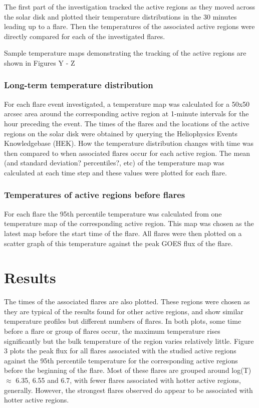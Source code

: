 \documentclass{article}
\begin{document}
The first part of the investigation tracked the active regions as they moved across the solar disk and plotted their temperature distributions in the 30 minutes leading up to a flare.
Then the temperatures of the associated active regions were directly compared for each of the investigated flares.

Sample temperature maps demonstrating the tracking of the active regions are shown in Figures Y - Z

\subsubsection{Long-term temperature distribution}
For each flare event investigated, a temperature map was calculated for a 50x50 arcsec area around the corresponding active region at 1-minute intervals for the hour preceding the event. %
The times of the flares and the locations of the active regions on the solar disk were obtained by querying the Heliophysics Events Knowledgebase (HEK).
How the temperature distribution changes with time was then compared to when associated flares occur for each active region.
The mean (and standard deviation? percentiles?, etc) of the temperature map was calculated at each time step and these values were plotted for each flare.

\subsubsection{Temperatures of active regions before flares}
For each flare the 95th percentile temperature was calculated from one temperature map of the corresponding active region.
This map was chosen as the latest map before the start time of the flare. %
All flares were then plotted on a scatter graph of this temperature against the peak GOES flux of the flare.

\section{Results}
The times of the associated flares are also plotted.
These regions were chosen as they are typical of the results found for other active regions, and show similar temperature profiles but different numbers of flares.
In both plots, some time before a flare or group of flares occur, the maximum temperature rises significantly but the bulk temperature of the region varies relatively little.
Figure 3 plots the peak flux for all flares associated with the studied active regions against the 95th percentile temperature for the corresponding active regions before the beginning of the flare.
Most of these flares are grouped around log(T) $\approx$ 6.35, 6.55 and 6.7, with fewer flares associated with hotter active regions, generally.
However, the strongest flares observed do appear to be associated with hotter active regions.
\end{document}
